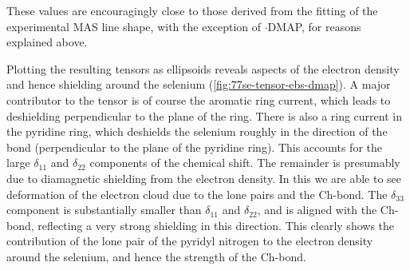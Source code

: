 \begin{refsection}
These values are encouragingly close to those derived from the fitting of the experimental MAS line shape, with the exception of $\cdot$DMAP, for reasons explained above.

Plotting the resulting tensors as ellipsoids reveals aspects of the electron density and hence shielding around the selenium (\cref{fig:77se-tensor-ebs-dmap}).
A major contributor to the tensor is of course the aromatic ring current, which leads to deshielding perpendicular to the plane of the ring.
There is also a ring current in the pyridine ring, which deshields the selenium roughly in the direction of the  bond (perpendicular to the plane of the pyridine ring).
This accounts for the large $\delta_{11}$ and $\delta_{22}$ components of the chemical shift.
The remainder is presumably due to diamagnetic shielding from the electron density.
In this we are able to see deformation of the electron cloud due to the lone pairs and the Ch-bond.
The  $\delta_{33}$ component is substantially smaller than $\delta_{11}$ and $\delta_{22}$, and is aligned with the Ch-bond, reflecting a very strong shielding in this direction.
This clearly shows the contribution of the lone pair of the pyridyl nitrogen to the electron density around the selenium, and hence the strength of the Ch-bond.


\end{refsection}
